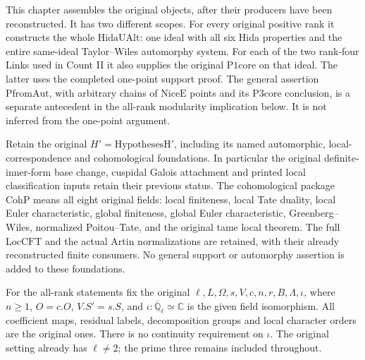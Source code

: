 \documentclass[11pt,a4paper]{article}
\numberwithin{equation}{section}
\theoremstyle{remark}\newtheorem{remark}[theorem]{Remark}
\begin{document}
This chapter assembles the original objects, after their producers
have been reconstructed.  It has two different scopes.  For every
original positive rank it constructs the whole
\(\mathrm{HidaUAlt}\): one ideal with all six Hida properties
and the entire same-ideal Taylor--Wiles automorphy system.  For
each of the two rank-four Links used in Count II it also supplies
the original \(\mathrm{P1core}\) on that ideal.  The latter uses
the completed one-point support proof.  The general assertion
\(\mathrm{PfromAut}\), with arbitrary chains of
\(\mathrm{NiceE}\) points and its \(\mathrm{P3core}\) conclusion,
is a separate antecedent in the all-rank modularity implication
below.  It is not inferred from the one-point argument.

Retain the original \(H'=\mathrm{HypothesesH}'\), including its
named automorphic, local-correspondence and cohomological
foundations.  In particular the original definite-inner-form
base change, cuspidal Galois attachment and printed local
classification inputs retain their previous status.  The
cohomological package \(\mathrm{CohP}\) means all eight original
fields: local finiteness, local Tate duality, local Euler
characteristic, global finiteness, global Euler characteristic,
Greenberg--Wiles, normalized Poitou--Tate, and the original tame
local theorem.  The full \(\mathrm{LocCFT}\) and the actual
Artin normalizations are retained, with their already reconstructed
finite consumers.  No general support or automorphy assertion is
added to these foundations.

For the all-rank statements fix the original
\(\ell,L,\Omega,s,V,c,n,r,B,\Lambda,\iota\), where
\(n\geq1\), \(O=c.O\), \(V.S'=s.S\), and
\(\iota:\overline{\mathbb Q}_\ell\simeq\mathbb C\) is the
given field isomorphism.  All coefficient maps, residual labels,
decomposition groups and local character orders are the original
ones.  There is no continuity requirement on \(\iota\).
The original setting already has \(\ell\ne2\); the prime three
remains included throughout.

\end{document}
